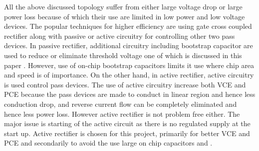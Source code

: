 \documentclass[12pt,a4paper,UKenglish]{article}
\begin{document}
All the above discussed topology suffer from either large voltage drop or large power loss because of which their use are limited in low power and low voltage devices. The popular techniques for higher efficiency are using gate cross coupled rectifier along with passive or active circuitry  for controlling other two pass devices. In passive rectifier, additional circuitry including bootstrap capacitor are used to reduce or eliminate threshold voltage one of which is discussed in this paper \cite{rectboot}. However, use of on-chip bootstrap capacitors limits it use where chip area and speed is of importance. On the other hand, in active rectifier, active circuitry is used control pass devices. The use of active circuitry increase both VCE and PCE because the pass devices are made to conduct in linear region and hence less conduction drop, and reverse current flow can be completely eliminated and hence less power loss. However active rectifier is not problem free either. The major issue is starting of the active circuit as there is no regulated supply at the start up. Active rectifier is chosen for this project, primarily for better VCE and PCE and secondarily to avoid the use large on chip capacitors \cite{rectrcc}  and \cite{rectcomp}.

\newpage
\printbibliography
\end{document}
